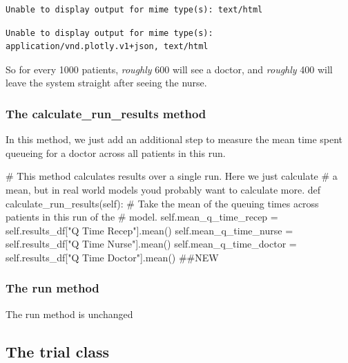 \documentclass[
  letterpaper,
  DIV=11,
  numbers=noendperiod]{scrreprt}
\newenvironment{Shaded}{\begin{snugshade}}{\end{snugshade}}
\newcommand{\CommentTok}[1]{\textcolor[rgb]{0.37,0.37,0.37}{#1}}
\newcommand{\KeywordTok}[1]{\textcolor[rgb]{0.00,0.23,0.31}{#1}}
\newcommand{\NormalTok}[1]{\textcolor[rgb]{0.00,0.23,0.31}{#1}}
\newcommand{\OperatorTok}[1]{\textcolor[rgb]{0.37,0.37,0.37}{#1}}
\newcommand{\StringTok}[1]{\textcolor[rgb]{0.13,0.47,0.30}{#1}}
\newcommand{\VariableTok}[1]{\textcolor[rgb]{0.07,0.07,0.07}{#1}}
\begin{document}
\begin{verbatim}
Unable to display output for mime type(s): text/html
\end{verbatim}

\begin{verbatim}
Unable to display output for mime type(s): application/vnd.plotly.v1+json, text/html
\end{verbatim}

So for every 1000 patients, \emph{roughly} 600 will see a doctor, and
\emph{roughly} 400 will leave the system straight after seeing the
nurse.

\subsubsection{The calculate\_run\_results
method}\label{the-calculate_run_results-method}

In this method, we just add an additional step to measure the mean time
spent queueing for a doctor across all patients in this run.

\begin{Shaded}
\begin{Highlighting}[]
\CommentTok{\# This method calculates results over a single run.  Here we just calculate}
\CommentTok{\# a mean, but in real world models you\textquotesingle{}d probably want to calculate more.}
\KeywordTok{def}\NormalTok{ calculate\_run\_results(}\VariableTok{self}\NormalTok{):}
    \CommentTok{\# Take the mean of the queuing times across patients in this run of the}
    \CommentTok{\# model.}
    \VariableTok{self}\NormalTok{.mean\_q\_time\_recep }\OperatorTok{=} \VariableTok{self}\NormalTok{.results\_df[}\StringTok{"Q Time Recep"}\NormalTok{].mean()}
    \VariableTok{self}\NormalTok{.mean\_q\_time\_nurse }\OperatorTok{=} \VariableTok{self}\NormalTok{.results\_df[}\StringTok{"Q Time Nurse"}\NormalTok{].mean()}
    \VariableTok{self}\NormalTok{.mean\_q\_time\_doctor }\OperatorTok{=} \VariableTok{self}\NormalTok{.results\_df[}\StringTok{"Q Time Doctor"}\NormalTok{].mean() }\CommentTok{\#\#NEW}
\end{Highlighting}
\end{Shaded}

\subsubsection{The run method}\label{the-run-method}

The run method is unchanged

\subsection{The trial class}\label{the-trial-class-1}
\end{document}
